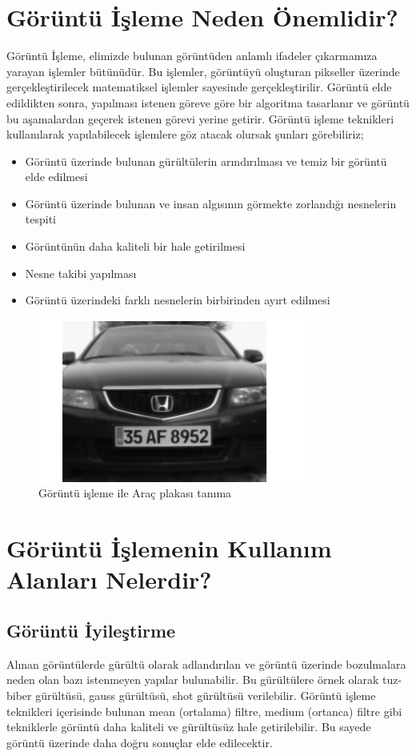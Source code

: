 \section{Görüntü İşleme Neden Önemlidir?}
\cite{görüntüişleme}Görüntü İşleme,  elimizde bulunan görüntüden anlamlı ifadeler çıkarmamıza yarayan işlemler bütünüdür. Bu işlemler, görüntüyü oluşturan pikseller üzerinde gerçekleştirilecek matematiksel işlemler sayesinde gerçekleştirilir. Görüntü elde edildikten sonra, yapılması istenen göreve göre bir algoritma tasarlanır ve görüntü bu aşamalardan geçerek istenen görevi yerine getirir.
Görüntü işleme teknikleri kullanılarak yapılabilecek işlemlere göz atacak olursak şunları görebiliriz;
\begin{itemize}
\item Görüntü üzerinde bulunan gürültülerin arındırılması ve temiz bir görüntü elde edilmesi
\item Görüntü üzerinde bulunan ve insan algısının görmekte zorlandığı nesnelerin tespiti
\item Görüntünün daha kaliteli bir hale getirilmesi
\item Nesne takibi yapılması
\item Görüntü üzerindeki farklı nesnelerin birbirinden ayırt edilmesi
\end{itemize}

\begin{figure}
    \centering
    \includegraphics{biteral filtre.PNG}
    \caption{Görüntü işleme ile Araç plakası tanıma }
    \label{fig:my_label}
\end{figure}
\section {Görüntü İşlemenin Kullanım Alanları Nelerdir?}
\newpage
\subsection{Görüntü İyileştirme}
Alınan görüntülerde gürültü olarak adlandırılan ve görüntü üzerinde bozulmalara neden olan bazı istenmeyen yapılar bulunabilir. Bu gürültülere örnek olarak tuz-biber gürültüsü, gauss gürültüsü, shot gürültüsü verilebilir. Görüntü işleme teknikleri içerisinde bulunan mean (ortalama) filtre, medium (ortanca) filtre gibi tekniklerle görüntü daha kaliteli ve gürültüsüz hale getirilebilir. Bu sayede görüntü üzerinde daha doğru sonuçlar elde edilecektir.
